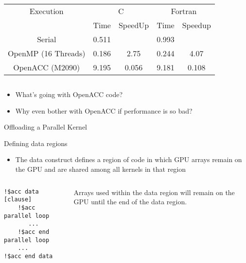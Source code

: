 \documentclass[c,mathserif,compress,xcolor=svgnames]{beamer}
\newenvironment{eblock}[0]
{
\begin{beamerboxesrounded}[upper=uppercol2,lower=lowercol2,shadow=true]}
{\end{beamerboxesrounded}}
\begin{document}
\begin{frame}
  \begin{columns}
    \begin{eblock}{}
      \begin{tabular}{|c|c|c|c|c|}
        \hline
        Execution& \multicolumn{2}{c|}{C}& \multicolumn{2}{c|}{Fortran} \\
        \cline{2-5}
        &  Time & SpeedUp & Time & Speedup \\
        \hline
        Serial & 0.511 & & 0.993 & \\
        OpenMP (16 Threads) & 0.186 & 2.75 & 0.244 & 4.07 \\
        OpenACC (M2090) & 9.195 & 0.056 & 9.181 & 0.108 \\
          \hline
      \end{tabular}
    \end{eblock}
  \end{columns}
  \begin{itemize}
    \item What's going with OpenACC code?
    \item Why even bother with OpenACC if performance is so bad?
  \end{itemize}
\end{frame}

\begin{frame}{\small Offloading a Parallel Kernel}
  
\end{frame}

\begin{frame}[fragile]{\small Defining data regions}
  \begin{itemize}
    \item The data construct defines a region of code in which GPU arrays remain on the GPU and are shared among all kernels in that region
  \end{itemize}
  \begin{columns}
    \column{9cm}
  \begin{eblock}{}
    \begin{columns}
      \column{3.5cm}
      \begin{lstlisting}[basicstyle=\tiny\ttfamily,language=OmpFortran]
!$acc data [clause]
    !$acc parallel loop
       ...
    !$acc end parallel loop
    ...
!$acc end data
      \end{lstlisting}
      \column{0.5cm}
      \fontsize{55}{20}\selectfont{\color{tigerspurple}\}}
      \column{3cm}
      Arrays used within the data region will remain on the GPU until the end of the data region.
    \end{columns}
  \end{eblock}
  \end{columns}
\end{frame}
\end{document}
